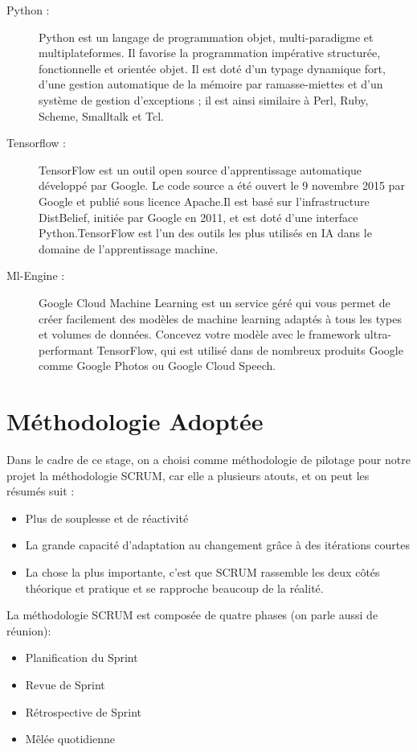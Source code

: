 \begin{description}
\item[Python : ] Python est un langage de programmation objet, multi-paradigme et multiplateformes. Il favorise la programmation impérative structurée, fonctionnelle et orientée objet. Il est doté d'un typage dynamique fort, d'une gestion automatique de la mémoire par ramasse-miettes et d'un système de gestion d'exceptions ; il est ainsi similaire à Perl, Ruby, Scheme, Smalltalk et Tcl.
\item[Tensorflow : ]TensorFlow est un outil open source d'apprentissage automatique développé par Google. Le code source a été ouvert le 9 novembre 2015 par Google et publié sous licence Apache.Il est basé sur l'infrastructure DistBelief, initiée par Google en 2011, et est doté d'une interface Python.TensorFlow est l'un des outils les plus utilisés en IA dans le domaine de l'apprentissage machine.
\item[Ml-Engine : ]Google Cloud Machine Learning est un service géré qui vous permet de créer facilement des modèles de machine learning adaptés à tous les types et volumes de données. Concevez votre modèle avec le framework ultra-performant TensorFlow, qui est utilisé dans de nombreux produits Google comme Google Photos ou Google Cloud Speech. 
\end{description}
\section{Méthodologie Adoptée}
Dans le cadre de ce stage, on a choisi comme méthodologie de pilotage pour notre projet la méthodologie SCRUM, car elle a plusieurs atouts, et on peut les résumés suit :
\begin{itemize}
\item Plus de souplesse et de réactivité
\item La grande capacité d’adaptation au changement grâce à des itérations courtes
\item La chose la plus importante, c’est que SCRUM rassemble les deux côtés théorique et pratique et se rapproche beaucoup de la réalité.
\end{itemize}

La méthodologie SCRUM est composée de quatre phases (on parle aussi de réunion):
\begin{itemize}
\item Planification du Sprint
\item Revue de Sprint
\item Rétrospective de Sprint
\item Mêlée quotidienne
\end{itemize}
